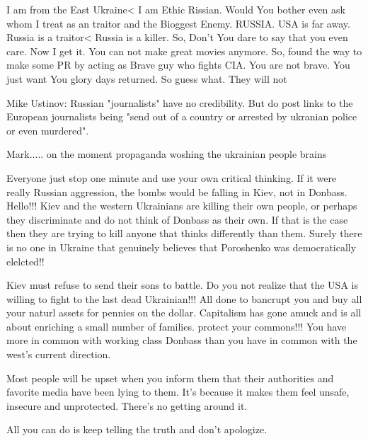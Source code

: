 \begin{itemize}
\begin{itemize}

I am from the East Ukraine< I am Ethic Rissian. Would You bother even ask whom
I treat as an traitor and the Bioggest Enemy. RUSSIA. USA is far away. Russia
is a traitor< Russia is a killer. So, Don't You dare to say that you even care.
Now I get it. You can not make great movies anymore. So, found the way to make
some PR by acting as Brave guy who fights CIA. You are not brave. You just want
You glory days returned. So guess what. They will not



Mike Ustinov: Russian "journalists" have no credibility. But do post links to
the European journalists being "send out of a country or arrested by ukranian
police or even murdered".

Mark..... on the moment propaganda woshing the ukrainian people brains


Everyone just stop one minute and use your own critical thinking. If it were
really Russian aggression, the bombs would be falling in Kiev, not in Donbass.
Hello!!! Kiev and the western Ukrainians are killing their own people, or
perhaps they discriminate and do not think of Donbass as their own. If that is
the case then they are trying to kill anyone that thinks differently than them.
Surely there is no one in Ukraine that genuinely believes that Poroshenko was
democratically elelcted!!


Kiev must refuse to send their sons to battle. Do you not realize that the USA
is willing to fight to the last dead Ukrainian!!! All done to bancrupt you and
buy all your naturl assets for pennies on the dollar. Capitalism has gone amuck
and is all about enriching a small number of families. protect your commons!!!
You have more in common with working class Donbass than you have in common with
the west's current direction.

\end{itemize} %


Most people will be upset when you inform them that their authorities and
favorite media have been lying to them. It's because it makes them feel unsafe,
insecure and unprotected. There's no getting around it.

All you can do is keep telling the truth and don't apologize.


\end{itemize}
